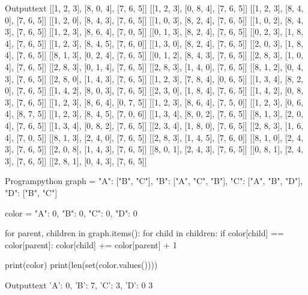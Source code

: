 \documentclass[11pt]{ipu-python}
\begin{document}
    \begin{code}
        {Output}{text}
[[1, 2, 3], [8, 0, 4], [7, 6, 5]]
[[1, 2, 3], [0, 8, 4], [7, 6, 5]]
[[1, 2, 3], [8, 4, 0], [7, 6, 5]]
[[1, 2, 0], [8, 4, 3], [7, 6, 5]]
[[1, 0, 3], [8, 2, 4], [7, 6, 5]]
[[1, 0, 2], [8, 4, 3], [7, 6, 5]]
[[1, 2, 3], [8, 6, 4], [7, 0, 5]]
[[0, 1, 3], [8, 2, 4], [7, 6, 5]]
[[0, 2, 3], [1, 8, 4], [7, 6, 5]]
[[1, 2, 3], [8, 4, 5], [7, 6, 0]]
[[1, 3, 0], [8, 2, 4], [7, 6, 5]]
[[2, 0, 3], [1, 8, 4], [7, 6, 5]]
[[8, 1, 3], [0, 2, 4], [7, 6, 5]]
[[0, 1, 2], [8, 4, 3], [7, 6, 5]]
[[2, 8, 3], [1, 0, 4], [7, 6, 5]]
[[2, 8, 3], [0, 1, 4], [7, 6, 5]]
[[2, 8, 3], [1, 4, 0], [7, 6, 5]]
[[8, 1, 2], [0, 4, 3], [7, 6, 5]]
[[2, 8, 0], [1, 4, 3], [7, 6, 5]]
[[1, 2, 3], [7, 8, 4], [0, 6, 5]]
[[1, 3, 4], [8, 2, 0], [7, 6, 5]]
[[1, 4, 2], [8, 0, 3], [7, 6, 5]]
[[2, 3, 0], [1, 8, 4], [7, 6, 5]]
[[1, 4, 2], [0, 8, 3], [7, 6, 5]]
[[1, 2, 3], [8, 6, 4], [0, 7, 5]]
[[1, 2, 3], [8, 6, 4], [7, 5, 0]]
[[1, 2, 3], [0, 6, 4], [8, 7, 5]]
[[1, 2, 3], [8, 4, 5], [7, 0, 6]]
[[1, 3, 4], [8, 0, 2], [7, 6, 5]]
[[8, 1, 3], [2, 0, 4], [7, 6, 5]]
[[1, 3, 4], [0, 8, 2], [7, 6, 5]]
[[2, 3, 4], [1, 8, 0], [7, 6, 5]]
[[2, 8, 3], [1, 6, 4], [7, 0, 5]]
[[8, 1, 3], [2, 4, 0], [7, 6, 5]]
[[2, 8, 3], [1, 4, 5], [7, 6, 0]]
[[8, 1, 0], [2, 4, 3], [7, 6, 5]]
[[2, 0, 8], [1, 4, 3], [7, 6, 5]]
[[8, 0, 1], [2, 4, 3], [7, 6, 5]]
[[0, 8, 1], [2, 4, 3], [7, 6, 5]]
[[2, 8, 1], [0, 4, 3], [7, 6, 5]]
    \end{code}

    \vspace*{15pt}
    \begin{code}
        {Program}{python}
graph = {
    "A": ["B", "C"],
    "B": ["A", "C", "B"],
    "C": ["A", "B", "D"],
    "D": ["B", "C"]
}

color = {
    "A": 0,
    "B": 0,
    "C": 0,
    "D": 0
}

for parent, children in graph.items():
    for child in children:
        if color[child] == color[parent]:
            color[child] += color[parent] + 1

print(color)
print(len(set(color.values())))
    \end{code}
    \begin{code}
        {Output}{text}
{'A': 0, 'B': 7, 'C': 3, 'D': 0}
3
    \end{code}
\end{document}
